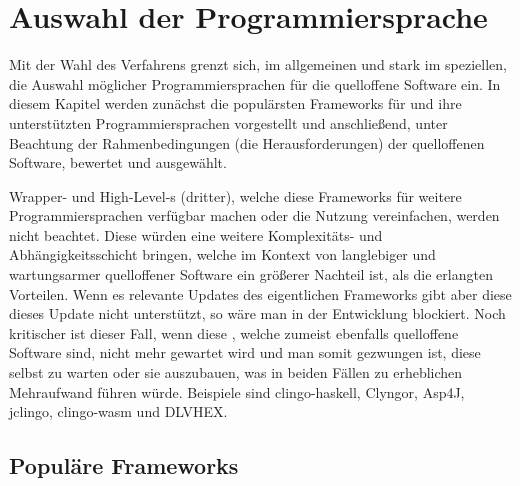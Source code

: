 \section{Auswahl der Programmiersprache}\label{sec:auswahl-der-programmiersprache}


Mit der Wahl des Verfahrens grenzt sich, im allgemeinen und stark im speziellen, die Auswahl möglicher Programmiersprachen für die quelloffene Software ein.
In diesem Kapitel werden zunächst die populärsten Frameworks für  und ihre unterstützten Programmiersprachen vorgestellt und anschließend, unter Beachtung der Rahmenbedingungen (die Herausforderungen) der quelloffenen Software, bewertet und ausgewählt.

Wrapper- und High-Level-s (dritter), welche diese Frameworks für weitere Programmiersprachen verfügbar machen oder die Nutzung vereinfachen, werden nicht beachtet.
Diese würden eine weitere Komplexitäts- und Abhängigkeitsschicht bringen, welche im Kontext von langlebiger und wartungsarmer quelloffener Software ein größerer Nachteil ist, als die erlangten Vorteilen.
Wenn es \zB relevante Updates des eigentlichen Frameworks gibt aber diese  dieses Update nicht unterstützt, so wäre man in der Entwicklung blockiert.
Noch kritischer ist dieser Fall, wenn diese , welche zumeist ebenfalls quelloffene Software sind, nicht mehr gewartet wird und man somit gezwungen ist, diese selbst zu warten oder sie auszubauen, was in beiden Fällen zu erheblichen Mehraufwand führen würde.
Beispiele sind clingo-haskell, Clyngor, Asp4J, jclingo, clingo-wasm und DLVHEX.


\subsection{Populäre Frameworks}\label{subsec:populare-frameworks}


